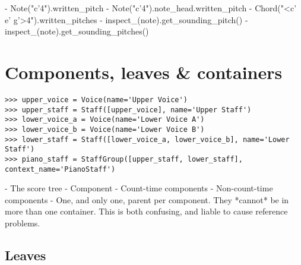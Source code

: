 \begin{markdown}
-   Note("c'4").written_pitch
-   Note("c'4").note_head.written_pitch
-   Chord("<c' e' g'>4").written_pitches
-   inspect_(note).get_sounding_pitch()
-   inspect_(note).get_sounding_pitches()
\end{markdown}

\section{Components, leaves \& containers}

\begin{comment}
<abjad>
upper_voice = Voice(name='Upper Voice')
upper_staff = Staff([upper_voice], name='Upper Staff')
lower_voice_a = Voice(name='Lower Voice A')
lower_voice_b = Voice(name='Lower Voice B')
lower_staff = Staff([lower_voice_a, lower_voice_b], name='Lower Staff')
piano_staff = StaffGroup([upper_staff, lower_staff], context_name='PianoStaff')
</abjad>
\end{comment}

\begin{abjadbookoutput}
\begin{singlespacing}
\vspace{-0.5\baselineskip}
\begin{lstlisting}
>>> upper_voice = Voice(name='Upper Voice')
>>> upper_staff = Staff([upper_voice], name='Upper Staff')
>>> lower_voice_a = Voice(name='Lower Voice A')
>>> lower_voice_b = Voice(name='Lower Voice B')
>>> lower_staff = Staff([lower_voice_a, lower_voice_b], name='Lower Staff')
>>> piano_staff = StaffGroup([upper_staff, lower_staff], context_name='PianoStaff')
\end{lstlisting}
\end{singlespacing}
\end{abjadbookoutput}

\begin{markdown}
-   The score tree
-   Component
-   Count-time components
-   Non-count-time components
-   One, and only one, parent per component. They *cannot* be in more than one
    container. This is both confusing, and liable to cause reference problems.
\end{markdown}

\subsection{Leaves}


